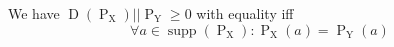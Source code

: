 We have 
$\operatorname{D}(\operatorname{P}_{\operatorname{X}}) || \operatorname{P}_{\operatorname{Y}} \geq 0$
with equality iff
$$\forall a \in \operatorname{supp}(\operatorname{P}_{\operatorname{X}}) :\operatorname{P}_{\operatorname{X}}(a) = \operatorname{P}_{\operatorname{Y}}(a)$$
